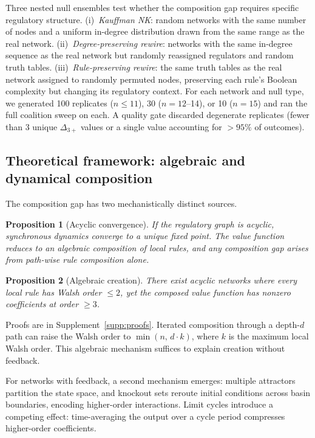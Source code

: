 \documentclass[10pt]{article}
\newtheorem{proposition}{Proposition}
\begin{document}
Three nested null ensembles test whether the composition gap requires
specific regulatory structure. (i)~\emph{Kauffman NK}: random
networks with the same number of nodes and a uniform in-degree
distribution drawn from the same range as the real network.
(ii)~\emph{Degree-preserving rewire}: networks with the same
in-degree sequence as the real network but randomly reassigned
regulators and random truth tables. (iii)~\emph{Rule-preserving
rewire}: the same truth tables as the real network assigned to
randomly permuted nodes, preserving each rule's Boolean complexity
but changing its regulatory context. For each network and null type,
we generated 100 replicates ($n \leq 11$), 30 ($n = 12$--14), or 10
($n = 15$) and ran the full coalition sweep on each. A quality gate
discarded degenerate replicates (fewer than 3 unique $\Delta_{3+}$
values or a single value accounting for $> 95\%$ of outcomes).


\subsection{Theoretical framework: algebraic and dynamical composition}
\label{sec:theory}

The composition gap has two mechanistically distinct sources.

\begin{proposition}[Acyclic convergence]
\label{prop:dag}
If the regulatory graph is acyclic, synchronous dynamics converge to
a unique fixed point. The value function reduces to an algebraic
composition of local rules, and any composition gap arises from
path-wise rule composition alone.
\end{proposition}

\begin{proposition}[Algebraic creation]
\label{prop:creation}
There exist acyclic networks where every local rule has Walsh order
$\leq 2$, yet the composed value function has nonzero coefficients at
order $\geq 3$.
\end{proposition}

Proofs are in Supplement~\ref{supp:proofs}. Iterated composition
through a depth-$d$ path can raise the Walsh order to
$\min(n,\, d \cdot k)$, where $k$ is the maximum local Walsh order.
This algebraic mechanism suffices to explain creation without
feedback.

For networks with feedback, a second mechanism emerges: multiple
attractors partition the state space, and knockout sets reroute
initial conditions across basin boundaries, encoding higher-order
interactions. Limit cycles introduce a competing effect:
time-averaging the output over a cycle period compresses higher-order
coefficients.
\end{document}

